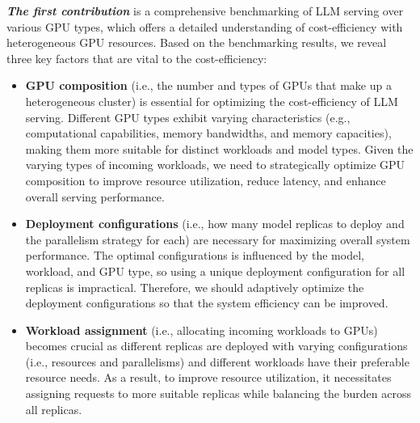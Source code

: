 \textbf{\textit{The first contribution}} is a comprehensive benchmarking of LLM serving over various GPU types, which offers a detailed understanding of cost-efficiency with heterogeneous GPU resources. 
Based on the benchmarking results, we reveal three key factors that are vital to the cost-efficiency:
\begin{itemize}[topsep=5pt, leftmargin=*]
    \vspace{-0.5em}
    \item \textbf{GPU composition} (i.e., the number and types of GPUs that make up a heterogeneous cluster) is essential for optimizing the cost-efficiency of LLM serving. Different GPU types exhibit varying characteristics (e.g., computational capabilities, memory bandwidths, and memory capacities), making them more suitable for distinct workloads and model types.
    Given the varying types of incoming workloads, we need to strategically optimize GPU composition to improve resource utilization, reduce latency, and enhance overall serving performance.
    \vspace{-0.5em}
    \item \textbf{Deployment configurations} (i.e., how many model replicas to deploy and the parallelism strategy for each) are necessary for maximizing overall system performance. The optimal configurations is influenced by the model, workload, and GPU type, so using a unique deployment configuration for all replicas is impractical.
    Therefore, we should adaptively optimize the deployment configurations so that the system efficiency can be improved.
    \vspace{-0.5em}
    \item \textbf{Workload assignment} (i.e., allocating incoming workloads to GPUs) becomes crucial as different replicas are deployed with varying configurations (i.e., resources and parallelisms) and different workloads have their preferable resource needs. 
    As a result, to improve resource utilization, it necessitates assigning requests to more suitable replicas while balancing the burden across all replicas. 

\end{itemize}
